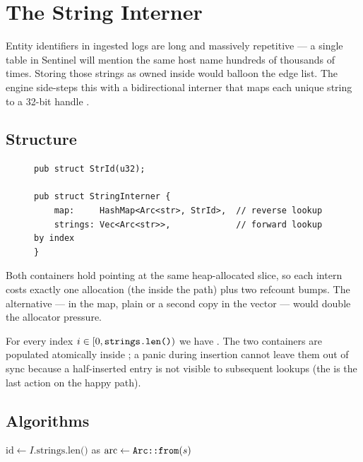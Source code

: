 \chapter{The String Interner}
\label{ch:interner}

Entity identifiers in ingested logs are long and massively
repetitive --- a single  table in Sentinel will
mention the same host name hundreds of thousands of times. Storing
those strings as owned  inside 
would balloon the edge list. The engine side-steps this with a
bidirectional interner that maps each unique string to a 32-bit
handle \StrId{}.

\section{Structure}

\begin{figure}[h]
\centering
\begin{lstlisting}[style=rust]
pub struct StrId(u32);

pub struct StringInterner {
    map:     HashMap<Arc<str>, StrId>,  // reverse lookup
    strings: Vec<Arc<str>>,             // forward lookup by index
}
\end{lstlisting}
\end{figure}

Both containers hold  pointing at the same
heap-allocated slice, so each intern costs exactly one allocation
(the  inside the  path) plus two
refcount bumps. The alternative ---  in the map, plain
 or a second copy in the vector --- would double the
allocator pressure.

\begin{invariant}
For every index $i \in [0, \code{strings.len()})$ we have
. The two containers are
populated atomically inside ; a panic during insertion
cannot leave them out of sync because a half-inserted entry is
not visible to subsequent lookups (the  is the
last action on the happy path).
\end{invariant}

\section{Algorithms}

\begin{algorithm}
\caption{\textsc{Intern}}\label{alg:intern}
$\text{id} \gets I.\text{strings.len()}$ as \;
$\text{arc} \gets \code{Arc::from}(s)$
\Return {}\;
\end{algorithm}

